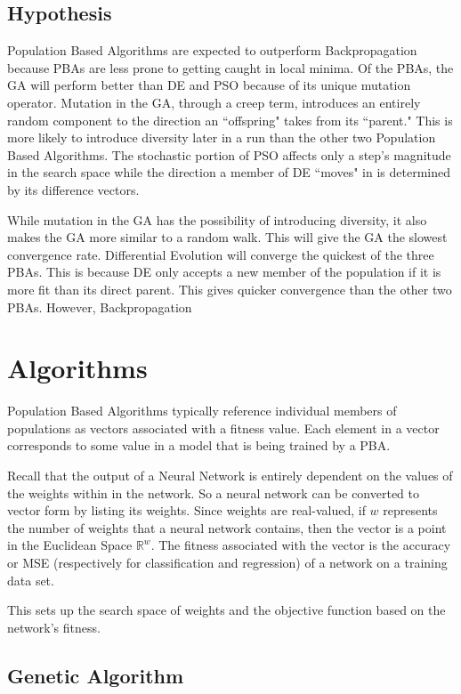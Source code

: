 \documentclass[twoside,11pt]{article}
\begin{document}
\subsection{Hypothesis}

	Population Based Algorithms are expected to outperform Backpropagation because PBAs are less prone to getting caught in local minima.
	Of the PBAs, the GA will perform better than DE and PSO because of its unique mutation operator. 
	Mutation in the GA, through a creep term, introduces an entirely random component to the direction an ``offspring" takes from its ``parent." 
	This is more likely to introduce diversity later in a run than the other two Population Based Algorithms. 
	The stochastic portion of PSO affects only a step's magnitude in the search space while the direction a member of DE ``moves" in is determined by its difference vectors.
	
	While mutation in the GA has the possibility of introducing diversity, it also makes the GA more similar to a random walk. This will give the GA the slowest convergence rate. 
	Differential Evolution will converge the quickest of the three PBAs. This is because DE only accepts a new member of the population if it is more fit than its direct parent. 
	This gives quicker convergence than the other two PBAs. However, Backpropagation 

\section{Algorithms}

	Population Based Algorithms typically reference individual members of populations as vectors associated with a fitness value. Each element in a vector corresponds to some value in a model that is being trained by a PBA.

	Recall that the output of a Neural Network is entirely dependent on the values of the weights within in the network.
	So a neural network can be converted to vector form by listing its weights.
	Since weights are real-valued, if $w$ represents the number of weights that a neural network contains, then the vector is a point in the Euclidean Space $\mathbb{R}^w$.
	The fitness associated with the vector is the accuracy or MSE (respectively for classification and regression) of a network on a training data set.

	This sets up the search space of weights and the objective function based on the network's fitness.

\subsection{Genetic Algorithm}
\end{document}
